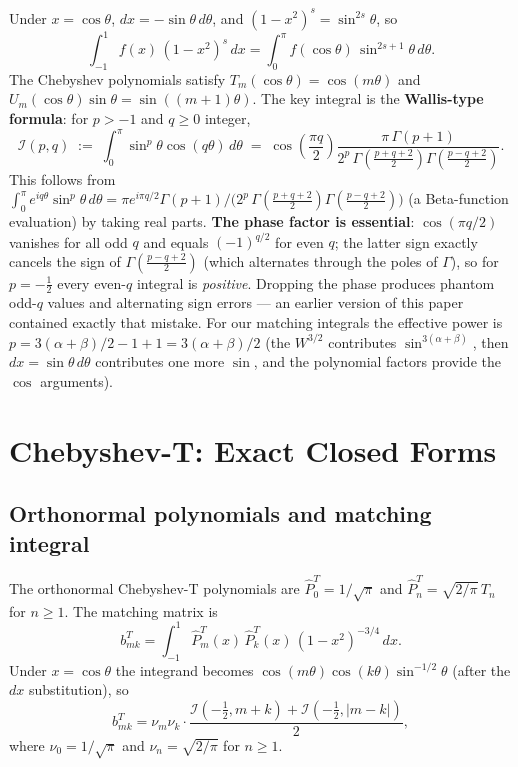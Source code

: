 \documentclass[11pt,a4paper]{article}
\newcommand{\G}{\Gamma}
\begin{document}
Under $x=\cos\theta$, $dx=-\sin\theta\,d\theta$, and
$(1-x^2)^s = \sin^{2s}\theta$, so
\[
  \int_{-1}^1 f(x)\,(1-x^2)^s\,dx = \int_0^\pi f(\cos\theta)\,\sin^{2s+1}\theta\,d\theta.
\]
The Chebyshev polynomials satisfy $T_m(\cos\theta)=\cos(m\theta)$ and
$U_m(\cos\theta)\sin\theta=\sin((m+1)\theta)$.
The key integral is the \textbf{Wallis-type formula}: for $p>-1$ and $q\ge0$ integer,
\begin{equation}\label{eq:wallis}
  \mathcal{I}(p,q) \;:=\; \int_0^\pi \sin^p\theta\cos(q\theta)\,d\theta
  \;=\; \cos\!\left(\frac{\pi q}{2}\right)
  \frac{\pi\,\G(p+1)}{2^p\,\G\!\left(\frac{p+q+2}{2}\right)\G\!\left(\frac{p-q+2}{2}\right)}.
\end{equation}
This follows from
$\int_0^{\pi}e^{iq\theta}\sin^p\theta\, d\theta
 = \pi e^{i\pi q/2}\G(p+1)/\bigl(2^p\,\G(\tfrac{p+q+2}{2})\G(\tfrac{p-q+2}{2})\bigr)$
(a Beta-function evaluation) by taking real parts.
\textbf{The phase factor is essential}: $\cos(\pi q/2)$ vanishes for all odd $q$
and equals $(-1)^{q/2}$ for even $q$; the latter sign exactly cancels the sign
of $\G(\tfrac{p-q+2}{2})$ (which alternates through the poles of $\G$), so for
$p=-\tfrac12$ every even-$q$ integral is \emph{positive}.  Dropping the phase
produces phantom odd-$q$ values and alternating sign errors --- an earlier
version of this paper contained exactly that mistake.
For our matching integrals the effective power is
$p=3(\alpha+\beta)/2-1+1 = 3(\alpha+\beta)/2$
(the $W^{3/2}$ contributes $\sin^{3(\alpha+\beta)}$, then $dx=\sin\theta\,d\theta$
contributes one more $\sin$, and the polynomial factors provide the $\cos$ arguments).

\section{Chebyshev-T: Exact Closed Forms}

\subsection{Orthonormal polynomials and matching integral}

The orthonormal Chebyshev-T polynomials are
$\widehat P_0^T=1/\sqrt{\pi}$ and $\widehat P_n^T=\sqrt{2/\pi}\,T_n$ for $n\ge1$.
The matching matrix is
\[
  b_{mk}^T
  = \int_{-1}^1 \widehat P_m^T(x)\,\widehat P_k^T(x)\,(1-x^2)^{-3/4}\,dx.
\]
Under $x=\cos\theta$ the integrand becomes $\cos(m\theta)\cos(k\theta)\sin^{-1/2}\theta$
(after the $dx$ substitution), so
\[
  b_{mk}^T = \nu_m\nu_k\cdot\frac{\mathcal{I}(-\tfrac12,m+k)+\mathcal{I}(-\tfrac12,|m-k|)}{2},
\]
where $\nu_0=1/\sqrt\pi$ and $\nu_n=\sqrt{2/\pi}$ for $n\ge1$.
\end{document}
